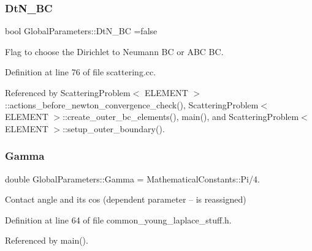 \mbox{\label{namespaceGlobalParameters_a6e2bba1769e86a5d3db88e2c7062bc63}} 
\subsubsection{\texorpdfstring{Dt\+N\+\_\+\+BC}{DtN\_BC}}
{\footnotesize\ttfamily bool Global\+Parameters\+::\+Dt\+N\+\_\+\+BC =false}



Flag to choose the Dirichlet to Neumann BC or A\+BC BC. 



Definition at line 76 of file scattering.\+cc.



Referenced by Scattering\+Problem$<$ E\+L\+E\+M\+E\+N\+T $>$\+::actions\+\_\+before\+\_\+newton\+\_\+convergence\+\_\+check(), Scattering\+Problem$<$ E\+L\+E\+M\+E\+N\+T $>$\+::create\+\_\+outer\+\_\+bc\+\_\+elements(), main(), and Scattering\+Problem$<$ E\+L\+E\+M\+E\+N\+T $>$\+::setup\+\_\+outer\+\_\+boundary().

\mbox{\label{namespaceGlobalParameters_adb0a994119055242fcc762cac5edc317}} 
\subsubsection{\texorpdfstring{Gamma}{Gamma}}
{\footnotesize\ttfamily double Global\+Parameters\+::\+Gamma = Mathematical\+Constants\+::\+Pi/4.}



Contact angle and its cos (dependent parameter -- is reassigned) 



Definition at line 64 of file common\+\_\+young\+\_\+laplace\+\_\+stuff.\+h.



Referenced by main().

\mbox{\label{namespaceGlobalParameters_aae73cb63b27d51a87845c3392cd944eb}} 
